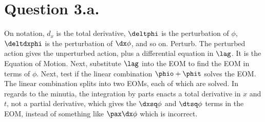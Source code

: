 \documentclass{article}
\begin{document}
\section{Question 3.a.}
On notation, $d_x$ is the total derivative, $\deltphi$ is the perturbation of $\phi$, $\deltdxphi$ is the perturbation of $\dx \phi$, and so on.
Perturb.
The perturbed action gives the unperturbed action, plus a differential equation in $\lag$. It is the Equation of Motion.
Next, substitute $\lag$ into the EOM to find the EOM in terms of $\phi$.
Next, test if the linear combination $\phio+\phit$ solves the EOM.
\e{\phi=\phio+\phit}
The linear combination splits into two EOMs, each of which are solved.
In regards to the minutia, the integration by parts enacts a total derivative in $x$ and $t$, not a partial derivative, which gives the $\dxsq \phi$ and $\dtsq \phi$ terms in the EOM, instead of something like $\pax \dx \phi$ which is incorrect.
\end{document}
